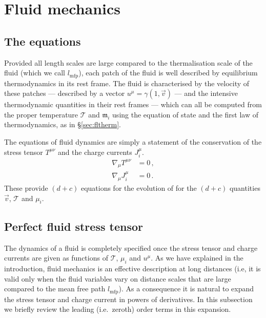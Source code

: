 \documentclass[12pt]{article}
\newcommand{\tloc}{\mathcal{T}}
\newcommand{\ml}{\mathfrak{m}}
\newcommand{\mfp}{l_{\mathrm{mfp}}}
\begin{document}
\section{Fluid mechanics}\label{sec:stress}

\subsection{The equations}\label{sec:basiceq}

Provided all length scales are large compared to the thermalisation scale of the fluid (which we call $\mfp$), each patch of the fluid is well described by equilibrium thermodynamics in its rest frame. The fluid is characterised by the velocity of these patches --- described by a vector $u^\mu=\gamma(1,\vec{v})$ --- and the intensive thermodynamic quantities in their rest frames --- which can all be computed from the proper temperature $\tloc$ and $\ml_i$ using the equation of state and the first law of thermodynamics, as in \S\ref{sec:fltherm}.

The equations of fluid dynamics are simply a statement of the conservation of the stress tensor $T^{\mu \nu}$ and the charge currents $J^\mu_i$.
%
\begin{equation}\label{Epconsv:eq} \begin{split}
  \nabla_\mu T^{\mu\nu} &%
                        = 0\,, \\
\nabla_\mu J^\mu_i &%
                        =0\,.
\end{split}
\end{equation}
%
These provide $(d+c)$ equations for the evolution of for the $(d+c)$ quantities $\vec{v}$, $\tloc$ and $\mu_i$.

\subsection{Perfect fluid stress tensor}\label{sec:perfstr}

The dynamics of a fluid is completely specified once the stress tensor and charge currents are given as functions of $\tloc$, $\mu_i$ and $u^\mu$. As we have explained in the introduction, fluid mechanics is an effective description at long distances (i.e, it is valid only when the fluid variables vary on distance scales that are large compared to the mean free path $l_\mathrm{mfp}$). As a consequence it is natural to expand the stress tensor and charge current in powers of derivatives. In this subsection we briefly review the leading (i.e.\ zeroth) order terms in this expansion.
\end{document}
